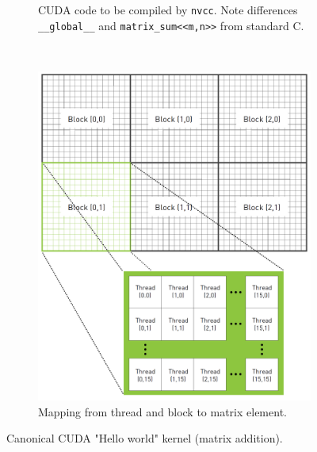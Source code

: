\begin{figure}
    \centering
    \begin{subfigure}{\linewidth}
        \centering
        \inputminted{c}{code/hello_world_kernel.c}
        \caption{CUDA code to be compiled by \texttt{nvcc}.
        Note differences \texttt{__global__} and \texttt{matrix_sum<<m,n>>} from standard C.}
        \label{lst:cuda_hello_world}
    \end{subfigure}
    \\[3ex]
    \begin{subfigure}{\linewidth}
        \centering
        \includegraphics[width=.8\linewidth]{figures/matrix_thread.png}
        \caption{Mapping from thread and block to matrix element.}
        \label{fig:matrix_thread}
    \end{subfigure}
    \caption{Canonical CUDA "Hello world" kernel (matrix addition).}
    \label{fig:cuda_hello_world}
\end{figure}

